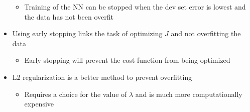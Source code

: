\documentclass[12pt, letterpaper]{article}
\begin{document}
\begin{itemize}
\begin{itemize}
            \item Training of the NN can be stopped when the dev set error is lowest and the data has not been overfit
        \end{itemize}
        \item Using early stopping links the task of optimizing $J$ and not overfitting the data
        \begin{itemize}
            \item Early stopping will prevent the cost function from being optimized 
        \end{itemize}
        \item L2 regularization is a better method to prevent overfitting
        \begin{itemize}
            \item Requires a choice for the value of $\lambda$ and is much more computationally expensive
        \end{itemize}
    \end{itemize}
\end{document}
